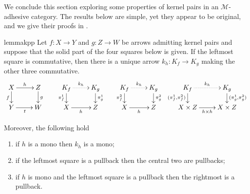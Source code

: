 \documentclass[a4paper,UKenglish,cleveref,pdftex,amsthm,thm-restate,numberwithinsect]{cas-sc}
\theoremstyle{plain}
\theoremstyle{definition}
\def\D{\textbf {\textup{D}}}
\def\X{\textbf {\textup{X}}}
\newcommand{\commentato}[1]{ {} }
\begin{document}
\commentato{ 
\begin{restatable}{corollary}{natepi}\label{cor:reg_epi_components_reg_epi_nat_trans}
    Let $\X$ be a category with pullbacks and $\phi\colon F \to G$ a natural transformation between functors $F, G: \D \rightrightarrows \X$. If $\phi_d$ is a regular epi for every $d$, then $\phi$ is a regular epi.
\end{restatable}

From the previous result we deduce that the class of regular epis is closed under colimits.

\begin{restatable}{lemma}{epicol}\label{lemma:nat_trans_reg_epi_canonical_arrow_reg_epi}
    Let $F,G\colon \D\rightrightarrows \X$ be two diagrams, and suppose that $\X$ has all colimits of shape $\D$. Let $(X, \{x_d\}_{d \in \D})$ and $(Y, \{y_d\}_{d\in D})$ be the colimits of $F$ and $G$, respectively.  If $\phi\colon  F \to G$ is a natural transformation whose components are regular epis, then the arrow induced by $\phi$ from $X$ to $Y$ is a regular epi.
\end{restatable}
}
We conclude this section exploring some properties of kernel pairs in an $\mathcal{M}$-adhesive category. 
The results below are simple, yet they appear to be original, and we give their proofs in .

\begin{restatable}{lemma}{kpp}\label{lemma:kern_pairs_pres_pullbacks}
	Let $f\colon X \to Y$ and $g\colon Z \to W$ be arrows admitting kernel pairs and suppose that the solid part of the four squares below is given. 
	If the leftmost square is commutative, then there is a unique arrow $k_h\colon K_f \to K_g$ making the other three commutative.
	\[\xymatrix@R=15pt{X \ar[r]^{h}\ar[d]_{f}& Z \ar[d]^{g} & K_f \ar@{.>}[r]^{k_h} \ar[d]_{\pi^1_f}& K_g \ar[d]^{\pi^1_g} & K_f  \ar@{.>}[r]^{k_h} \ar[d]_{\pi^2_f}& K_g \ar[d]^{\pi^2_g}& K_f  \ar@{.>}[r]^{k_h} \ar[d]_{(\pi^1_f,\pi^2_f)} & K_g \ar[d]^{(\pi^1_g, \pi^2_g)}\\ Y \ar[r]_t& W & X \ar[r]_{h} & Z & X\ar[r]_{h} &Z & X\times Z \ar[r]_{h\times h}& X\times Z}\]
	
		Moreover, the following hold
		\begin{enumerate}
			\item if $h$ is a mono then $k_h$ is a mono;
			\item if the leftmost square is a pullback then the central two are pullbacks;
			\item if $h$ is mono and the leftmost square is a pullback then the rightmost is a pullback.
		\end{enumerate} 
\end{restatable}
\end{document}
